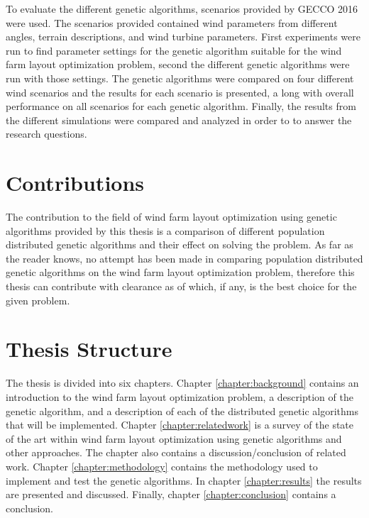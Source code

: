 \noindent To evaluate the different genetic algorithms, scenarios provided by GECCO 2016 were used. The scenarios provided contained wind parameters from different angles, terrain descriptions, and wind turbine parameters. First experiments were run to find parameter settings for the genetic algorithm suitable for the wind farm layout optimization problem, second the different genetic algorithms were run with those settings. The genetic algorithms were compared on four different wind scenarios and the results for each scenario is presented, a long with overall performance on all scenarios for each genetic algorithm. Finally, the results from the different simulations were compared and analyzed in order to to answer the research questions.


\section{Contributions}\label{section:contributions}
The contribution to the field of wind farm layout optimization using genetic algorithms provided by this thesis is a comparison of different population distributed genetic algorithms and their effect on solving the problem. As far as the reader knows, no attempt has been made in comparing population distributed genetic algorithms on the wind farm layout optimization problem, therefore this thesis can contribute with clearance as of which, if any, is the best choice for the given problem.


\section{Thesis Structure}\label{thesisstructure}
The thesis is divided into six chapters. Chapter \ref{chapter:background} contains an introduction to the wind farm layout optimization problem, a description of the genetic algorithm, and a description of each of the distributed genetic algorithms that will be implemented. Chapter \ref{chapter:relatedwork} is a survey of the state of the art within wind farm layout optimization using genetic algorithms and other approaches. The chapter also contains a discussion/conclusion of related work. Chapter \ref{chapter:methodology} contains the methodology used to implement and test the genetic algorithms. In chapter \ref{chapter:results} the results are presented and discussed. Finally, chapter \ref{chapter:conclusion} contains a conclusion.